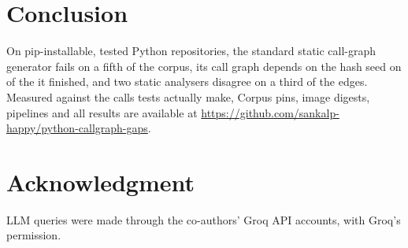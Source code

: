 \documentclass[conference]{IEEEtran}
\providecommand{\rqConclusion}{\pending}
\begin{document}
\section{Conclusion}

On pip-installable, tested Python repositories, the standard static call-graph generator fails on
a fifth of the corpus, its call graph depends on the hash seed on \nSetNondet{} of the \nSetSwept{}
it finished, and two static analysers disagree on a third of the edges. Measured against the calls tests actually make, \rqConclusion{}
Corpus pins, image digests, pipelines and all
results are available at \url{https://github.com/sankalp-happy/python-callgraph-gaps}.

\section*{Acknowledgment}
LLM queries were made through the co-authors' Groq API accounts, with Groq's permission.



\end{document}

